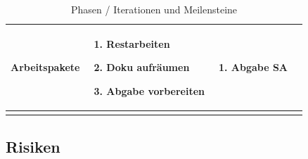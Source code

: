 \begin{landscape}
\begin{longtable}{l p{5.5cm} p{5.5cm} p{5.5cm}}
        \textbf{Arbeitspakete}
                                & \begin{enumerate}[noitemsep]
                                    \item Restarbeiten
                                    \item Doku aufräumen
                                    \item Abgabe vorbereiten
                                \end{enumerate}
                                & \begin{enumerate}[noitemsep]
                                    \item Abgabe SA
                                \end{enumerate}
                                & \\
        
        \bottomrule
    \caption{Phasen / Iterationen und Meilensteine}
    \label{table:Phasen / Iterationen und Meilensteine}
\end{longtable}
\end{landscape}

\subsection{Risiken}
\label{sub:Risiken}

